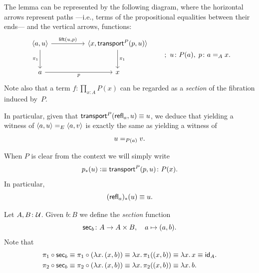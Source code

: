 \begin{rem}\label{rem:section-type}
    The lemma can be represented by the following diagram, where the horizontal arrows represent paths ---i.e., terms of the propositional equalities between their ends--- and the vertical arrows, functions:
    \[
        \begin{tikzcd}[row sep=large,column sep=huge]
            \dep{a,u}
                \arrow[r,"{\fun{lift}(u,p)}"]
                \arrow[d,"\pi_1"']
            &\dep{x,\fun{transport}^P(p,u)}
                \arrow[d,"\pi_1"] \\
            a
                \arrow[r,"p"']
            &x
        \end{tikzcd}
        \qquad;\ u\colon P(a),\;p\colon a\eq Ax.
    \]
    Note also that a term $f\colon\prod_{x\colon A}P(x)$ can be regarded as a \textsl{section} of the fibration induced by~$P$.

    In particular, given that\/ $\mathsf{transport}^P(\mathsf{refl}_a,u)\equiv u$, we deduce that yielding a witness of\/ $\langle a,u\rangle\mathrel{=_{E}}\langle a,v\rangle$ is exactly the same as yielding a witness of
    \begin{equation}\label{eq:Sigma-trivial-equality}
        u\mathrel{=_{P(a)}}v.
    \end{equation}
\end{rem}

\begin{ntn}\label{ntn:p_*}
    When\/ $P$ is clear from the context we will simply write
    \[
        p_*(u)\defeq\fun{transport}^P(p,u)\colon P(x).
    \]
    In particular,
    \begin{equation}\label{eq:refl-*}
        (\mathsf{refl}_a)_*(u)\equiv u.
    \end{equation}
\end{ntn}

\begin{defn}\label{defn:sec}
    Let $A,B\colon\univ$. Given $b\colon B$ we define the \textsl{section} function
    \[
        \fun{sec}_b\colon A\to A\times B,\quad a\mapsto(a,b).
    \]
    Note that
    \begin{align*}
        \pi_1\circ\mathsf{sec}_b
            &\equiv\pi_1\circ(\lambda x.\,(x,b))
            \equiv\lambda x.\,\pi_1((x,b))
            \equiv\lambda x.\,x
            \equiv\mathsf{id}_A.\\
        \pi_2\circ\mathsf{sec}_b
            &\equiv\pi_2\circ(\lambda x.\,(x,b))
            \equiv\lambda x.\,\pi_2((x,b))
            \equiv\lambda x.\,b.
    \end{align*}
\end{defn}

